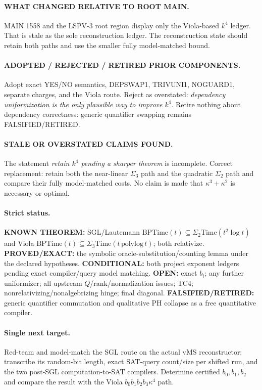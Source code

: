 \documentclass[11pt]{article}
\begin{document}
\paragraph{WHAT CHANGED RELATIVE TO ROOT MAIN.}
MAIN 1558 and the LSPV-3 root region display only the Viola-based $k^4$ ledger. That is stale as the sole reconstruction ledger. The reconstruction state should retain both paths and use the smaller fully model-matched bound.

\paragraph{ADOPTED / REJECTED / RETIRED PRIOR COMPONENTS.}
Adopt exact YES/NO semantics, DEPSWAP1, TRIVUNI1, NOGUARD1, separate charges, and the Viola route.
Reject as overstated: \emph{dependency uniformization is the only plausible way to improve $k^4$}.
Retire nothing about dependency correctness: generic quantifier swapping remains FALSIFIED/RETIRED.

\paragraph{STALE OR OVERSTATED CLAIMS FOUND.}
The statement \emph{retain $k^4$ pending a sharper theorem} is incomplete. Correct replacement: retain both the near-linear $\Sigma_3$ path and the quadratic $\Sigma_2$ path and compare their fully model-matched costs. No claim is made that $\kappa^3+\kappa^2$ is necessary or optimal.

\paragraph{Strict status.}
\textbf{KNOWN THEOREM:} SGL/Lautemann $\mathrm{BPTime}(t)\subseteq\Sigma_2\mathrm{Time}(t^2\log t)$ and Viola $\mathrm{BPTime}(t)\subseteq\Sigma_3\mathrm{Time}(t\,\mathrm{polylog}\,t)$; both relativize.
\textbf{PROVED/EXACT:} the symbolic oracle-substitution/counting lemma under the declared hypotheses.
\textbf{CONDITIONAL:} both project exponent ledgers pending exact compiler/query model matching.
\textbf{OPEN:} exact $b_i$; any further uniformizer; all upstream $Q$/rank/normalization issues; TC4; nonrelativizing/nonalgebrizing hinge; final diagonal.
\textbf{FALSIFIED/RETIRED:} generic quantifier commutation and qualitative PH collapse as a free quantitative compiler.

\paragraph{Single next target.}
Red-team and model-match the SGL route on the actual vMS reconstructor: transcribe its random-bit length, exact SAT-query count/size per shifted run, and the two post-SGL computation-to-SAT compilers. Determine certified $b_0,b_1,b_2$ and compare the result with the Viola $b_0b_1b_2b_3\kappa^4$ path.
\end{document}
